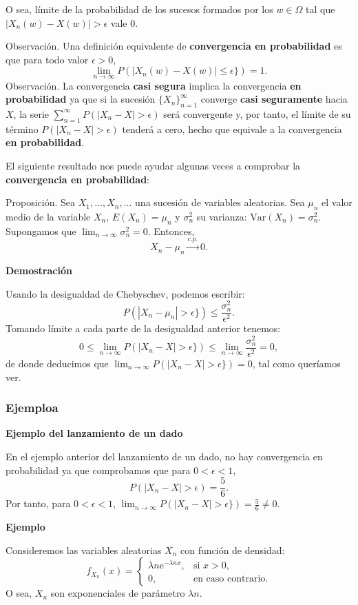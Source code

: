 \documentclass[]{book}
\begin{document}
O sea, límite de la probabilidad de los sucesos formados por los \(w\in\Omega\) tal que \(|X_n(w)-X(w)|>\epsilon\) vale 0.

Observación.
Una definición equivalente de \textbf{convergencia en probabilidad} es que para todo valor \(\epsilon >0\),
\[
\lim_{n\to\infty} P(|X_n(w)-X(w)|\leq \epsilon \})=1.
\]
Observación.
La convergencia \textbf{casi segura} implica la convergencia \textbf{en probabilidad} ya que si la sucesión \(\{X_n\}_{n=1}^\infty\) converge \textbf{casi seguramente} hacia \(X\), la serie \(\sum_{n=1}^\infty P(|X_n-X|>\epsilon)\) será convergente y, por tanto, el límite de su término \(P(|X_n-X|>\epsilon)\) tenderá a cero, hecho que equivale a la convergencia \textbf{en probabilidad}.

El siguiente resultado nos puede ayudar algunas veces a comprobar la \textbf{convergencia en probabilidad}:

Proposición.
Sea \(X_1,\ldots,X_n,\ldots\) una sucesión de variables aleatorias. Sea \(\mu_n\) el valor medio de la variable \(X_n\), \(E(X_n)=\mu_n\) y \(\sigma_n^2\) su varianza: \(\mathrm{Var}(X_n)=\sigma_n^2\). Supongamos que \(\lim_{n\to\infty}\sigma_n^2=0\). Entonces,
\[
X_n-\mu_n\stackrel{c.p.}{\longrightarrow} 0.
\]

\textbf{Demostración}

Usando la desigualdad de Chebyschev, podemos escribir:
\[
P(|X_n-\mu_n|>\epsilon \}) \leq \frac{\sigma_n^2}{\epsilon^2}.
\]
Tomando límite a cada parte de la desigualdad anterior tenemos:
\[
0\leq \lim_{n\to\infty} P(|X_n-X|>\epsilon \}) \leq \lim_{n\to\infty}\frac{\sigma_n^2}{\epsilon^2}=0,
\]
de donde deducimos que \(\lim_{n\to\infty} P(|X_n-X|>\epsilon \})=0\), tal como queríamos ver.

\hypertarget{ejemploa}{%
\subsubsection{Ejemploa}\label{ejemploa}}

\textbf{Ejemplo del lanzamiento de un dado}

En el ejemplo anterior del lanzamiento de un dado, no hay convergencia en probabilidad ya que comprobamos que para \(0<\epsilon<1\),
\[
P(|X_n-X|>\epsilon)=\frac{5}{6}.
\]
Por tanto, para \(0<\epsilon<1\), \(\lim_{n\to\infty} P(|X_n-X|>\epsilon \})=\frac{5}{6}\neq 0.\)

\textbf{Ejemplo}

Consideremos las variables aleatorias \(X_n\) con función de densidad:
\[
f_{X_n}(x)=\begin{cases}
\lambda n\mathrm{e}^{-\lambda n x}, & \mbox{si }x>0,\\
0, & \mbox{en caso contrario.}
\end{cases}
\]
O sea, \(X_n\) son exponenciales de parámetro \(\lambda n\).
\end{document}
